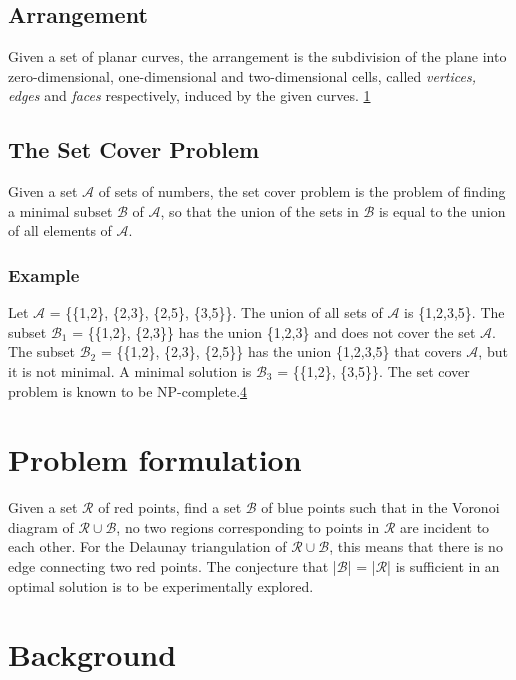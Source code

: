 \documentclass[a4paper,12pt]{article}
\begin{document}
\subsection{Arrangement}
\label{sec:arrangement}
Given a set of planar curves, the arrangement is the subdivision of the plane into zero-dimensional, one-dimensional and two-dimensional cells, called \emph{vertices, edges} and \emph{faces} respectively, induced by the given curves. \hyperref[ref:cgal]{1}

\subsection{The Set Cover Problem}
Given a set $\mathcal A$ of sets of numbers, the set cover problem is the problem of finding a minimal subset $\mathcal B$ of $\mathcal A$, so that the union of the sets in $\mathcal B$ is equal to the union of all elements of $\mathcal A$.

\subsubsection*{Example}
Let $\mathcal A$ =  \{\{1,2\}, \{2,3\}, \{2,5\}, \{3,5\}\}. The union of all sets of $\mathcal A$ is \{1,2,3,5\}. \newline
The subset $\mathcal B_1$ = \{\{1,2\}, \{2,3\}\} has the union \{1,2,3\} and does not cover the set $\mathcal A$. \newline
The subset $\mathcal B_2$ = \{\{1,2\}, \{2,3\}, \{2,5\}\} has the union \{1,2,3,5\} that covers $\mathcal A$, but it is not minimal. \newline
A minimal solution is $\mathcal B_3$ = \{\{1,2\}, \{3,5\}\}. \newline
The set cover problem is known to be NP-complete.\hyperref[ref:karp]{4}
\section{Problem formulation}
Given a set $\mathcal{R}$ of red points, find a set $\mathcal{B}$ of blue points such that in the Voronoi diagram of $\mathcal{R} \cup \mathcal{B}$, no two regions corresponding to points in $\mathcal{R}$ are incident to each other. For the Delaunay triangulation of $\mathcal{R} \cup \mathcal{B}$, this means that there is no edge connecting two red points. The conjecture that |$\mathcal{B}$| = |$\mathcal{R}$| is sufficient in an optimal solution is to be experimentally explored.


\section{Background}
\end{document}
